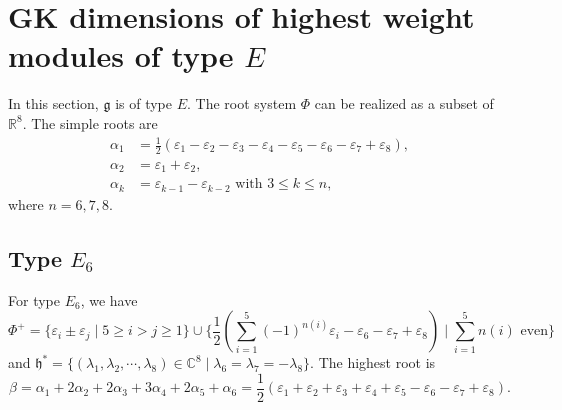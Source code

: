 \documentclass[reqno,12pt]{amsart}
\numberwithin{equation}{section}
\theoremstyle{plain}
\newtheorem{Cor}[Thm]{Corollary}
\theoremstyle{definition}
\newcommand{\lam}{\lambda}
\newcommand{\ep}{\varepsilon}
\newcommand{\gk}{Gelfand--Kirillov dimension }
\newcommand{\mf}[1]{\mathfrak{#1}}
\newcommand{\hs}{ \mathfrak{h}^*}
\newcommand{\gkd}{\operatorname{GKdim}}
\newcommand{\lest}{\leqslant}
\renewcommand{\geq}{\geqslant}
\begin{document}


\section{GK dimensions of  highest weight modules of type \texorpdfstring{$E$}{} }\label{e-gkd}



In this section, $\mf{g}$ is of type $ E $. The root system $ \Phi $ can be realized as a subset of $\mathbb{R}^8$.  The simple roots are 
\begin{align*}
\alpha_1&=\frac{1}{2}(\ep_1-\ep_2-\ep_3-\ep_4-\ep_5-\ep_6-\ep_7+\ep_8) ,\\
\alpha_2&=\ep_1+\ep_2,\\
\alpha_k&=\ep_{k-1}-\ep_{k-2} \text{ with }3\lest k\lest n,
\end{align*}
where $n=6, 7,8$. 




\subsection{Type \texorpdfstring{$E_6$}{}}
For type $E_6$, we have $$\Phi^+=
\{\ep_i \pm \ep_j \mid 5\geq i > j\geq 1\}\cup 
\Big\{\frac{1}{2}(\sum_{i=1}^5 (-1)^{n(i)}\ep_i -\ep_6-\ep_7+\ep_8)\mid \sum_{i=1}^5n(i) \text{ even}\Big\}$$
and $ \hs=\{ (\lam_1,\lam_2,\cdots,\lam_8)\in\mathbb{C}^8\mid \lam_6=\lam_7=-\lam_8\} $.  The highest root is $$\beta=\alpha_1+2\alpha_2+2\alpha_3+3\alpha_4+2\alpha_5+\alpha_6=\frac{1}{2}(\ep_1+\ep_2+\ep_3+\ep_4+\ep_5-\ep_6-\ep_7+\ep_8).$$
\end{document}
